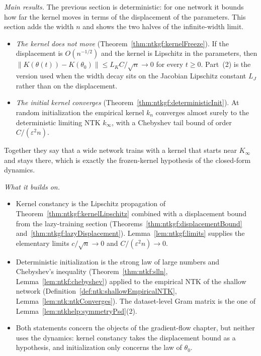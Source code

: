 \begin{remark}\label{rmk:ntkgf:infiniteWidthRole}
\emph{Main results.} The previous section is deterministic: for one network it bounds how far the kernel moves in terms of the displacement of the parameters. This section adds the width $n$ and shows the two halves of the infinite-width limit.
\begin{itemize}
  \item \emph{The kernel does not move} (Theorem~\ref{thm:ntkgf:kernelFreeze}). If the displacement is $O(n^{-1/2})$ and the kernel is Lipschitz in the parameters, then $\|K(\theta(t))-K(\theta_0)\|\le L_KC/\sqrt n\to0$ for every $t\ge0$. Part~(2) is the version used when the width decay sits on the Jacobian Lipschitz constant $L_J$ rather than on the displacement.
  \item \emph{The initial kernel converges} (Theorem~\ref{thm:ntkgf:deterministicInit}). At random initialization the empirical kernel $k_n$ converges almost surely to the deterministic limiting NTK $k_\infty$, with a Chebyshev tail bound of order $C/(\varepsilon^2n)$.
\end{itemize}
Together they say that a wide network trains with a kernel that starts near $K_\infty$ and stays there, which is exactly the frozen-kernel hypothesis of the closed-form dynamics.

\emph{What it builds on.}
\begin{itemize}
  \item Kernel constancy is the Lipschitz propagation of Theorem~\ref{thm:ntkgf:kernelLipschitz} combined with a displacement bound from the lazy-training section (Theorems~\ref{thm:ntkgf:displacementBound} and~\ref{thm:ntkgf:lazyDisplacement}). Lemma~\ref{lem:ntkgf:limits} supplies the elementary limits $c/\sqrt n\to0$ and $C/(\varepsilon^2n)\to0$.
  \item Deterministic initialization is the strong law of large numbers and Chebyshev's inequality (Theorem~\ref{thm:ntkf:slln}, Lemma~\ref{lem:ntkf:chebyshev}) applied to the empirical NTK of the shallow network (Definition~\ref{def:ntk:shallowEmpiricalNTK}, Lemma~\ref{lem:ntk:ntkConverges}). The dataset-level Gram matrix is the one of Lemma~\ref{lem:ntkhelp:symmetryPsd}(2).
  \item Both statements concern the objects of the gradient-flow chapter, but neither uses the dynamics: kernel constancy takes the displacement bound as a hypothesis, and initialization only concerns the law of $\theta_0$.
\end{itemize}


\end{remark}
